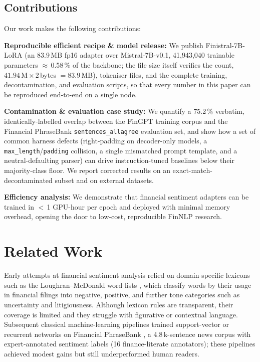 \documentclass[a4paper]{article}
\begin{document}
\subsection{Contributions}

Our work makes the following contributions:

\textbf{Reproducible efficient recipe \& model release:} We publish Finistral-7B-LoRA (an 83.9\,MB fp16 adapter over Mistral-7B-v0.1, 41{,}943{,}040 trainable parameters $\approx$\,0.58\,\% of the backbone; the file size itself verifies the count, $41.94\,\mathrm{M} \times 2$\,bytes $= 83.9$\,MB), tokeniser files, and the complete training, decontamination, and evaluation scripts, so that every number in this paper can be reproduced end-to-end on a single node.

\textbf{Contamination \& evaluation case study:} We quantify a 75.2\,\% verbatim, identically-labelled overlap between the FinGPT training corpus and the Financial PhraseBank \texttt{sentences\_allagree} evaluation set, and show how a set of common harness defects (right-padding on decoder-only models, a \texttt{max\_length}/\texttt{padding} collision, a single mismatched prompt template, and a neutral-defaulting parser) can drive instruction-tuned baselines below their majority-class floor. We report corrected results on an exact-match-decontaminated subset and on external datasets.

\textbf{Efficiency analysis:} We demonstrate that financial sentiment adapters can be trained in $<$\,1 GPU-hour per epoch and deployed with minimal memory overhead, opening the door to low-cost, reproducible FinNLP research.


\section{Related Work}

Early attempts at financial sentiment analysis relied on domain-specific lexicons such as the Loughran--McDonald word lists \cite{loughran2011}, which classify words by their usage in financial filings into negative, positive, and further tone categories such as uncertainty and litigiousness. Although lexicon rules are transparent, their coverage is limited and they struggle with figurative or contextual language. Subsequent classical machine-learning pipelines trained support-vector or recurrent networks on Financial PhraseBank \cite{malo2014}, a 4.8\,k-sentence news corpus with expert-annotated sentiment labels (16 finance-literate annotators); these pipelines achieved modest gains but still underperformed human readers.
\end{document}
